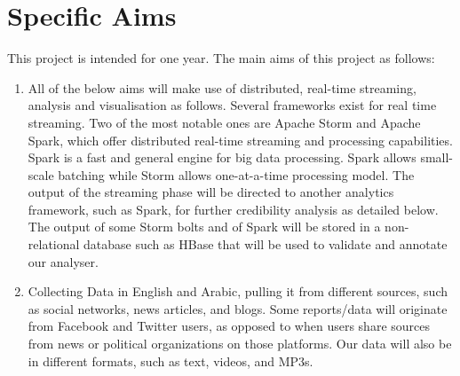 \section{Specific Aims}

This project is intended for one year. The main aims of this project as follows:

\begin{enumerate}
\item All of the below aims will make use of distributed, real-time streaming, analysis and visualisation as follows. Several frameworks exist for real time streaming. Two of the most notable ones are Apache Storm and Apache Spark, which offer distributed real-time streaming and processing capabilities. Spark is a fast and general engine for big data processing. Spark allows small-scale batching while Storm allows one-at-a-time processing model. The output of the streaming phase will be directed to another analytics framework, such as Spark, for further credibility analysis as detailed below. The output of some Storm bolts and of Spark will be stored in a non-relational database such as HBase that will be used to validate and annotate our analyser.
\item Collecting Data in English and Arabic, pulling it from different sources, such as social networks, news articles, and blogs. Some reports/data will originate from Facebook and Twitter users, as opposed to when users share sources from news or political organizations on those platforms. Our data will also be in different formats, such as text, videos, and MP3s. 


\end{enumerate}
